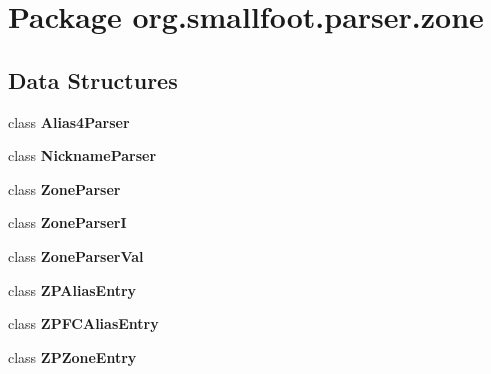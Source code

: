 \section{Package org.\-smallfoot.\-parser.\-zone}
\label{namespaceorg_1_1smallfoot_1_1parser_1_1zone}
\subsection*{Data Structures}
\begin{DoxyCompactItemize}
\item 
class {\bf Alias4\-Parser}
\item 
class {\bf Nickname\-Parser}
\item 
class {\bf Zone\-Parser}
\item 
class {\bf Zone\-Parser\-I}
\item 
class {\bf Zone\-Parser\-Val}
\item 
class {\bf Z\-P\-Alias\-Entry}
\item 
class {\bf Z\-P\-F\-C\-Alias\-Entry}
\item 
class {\bfseries Z\-P\-Zone\-Entry}
\end{DoxyCompactItemize}
